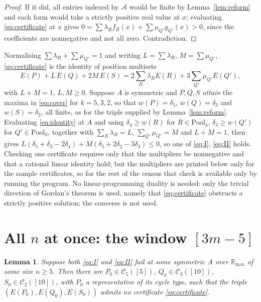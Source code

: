 \documentclass[11pt]{amsart}
\newtheorem{lemma}[theorem]{Lemma}
\newcommand{\Rmax}{\mathbb R_{\max}}
\newcommand{\dd}{\delta}
\newcommand{\Cov}{\mathcal C}
\newcommand{\Ee}{E}
\newcommand{\Allowed}{\mathcal A}
\begin{document}
\begin{proof}
If it did, all entries indexed by $\Allowed$ would be finite by
Lemma~\ref{lem:reform} and each form would take a strictly positive real value
at $x$; evaluating \eqref{eq:certificate} at $x$ gives
$0=\sum\lambda_Rf_R(x)+\sum\mu_{Q'}g_{Q'}(x)>0$, since the coefficients are
nonnegative and not all zero. Contradiction.
\end{proof}

Normalising $\sum\lambda_R+\sum\mu_{Q'}=1$ and writing
$L=\sum\lambda_R$, $M=\sum\mu_{Q'}$, \eqref{eq:certificate} is the identity of
position multisets
\begin{equation}\label{eq:identity}
 \Ee(P)+L\,\Ee(Q)+2M\,\Ee(S)
 = 2\sum_R\lambda_R\Ee(R)+3\sum_{Q'}\mu_{Q'}\Ee(Q') ,
\end{equation}
with $L+M=1$, $L,M\ge0$. Suppose $A$ is symmetric and $P,Q,S$ \emph{attain} the
maxima in \eqref{eq:cover} for $k=5,3,2$, so that $w(P)=\dd_5$, $w(Q)=\dd_3$ and
$w(S)=\dd_2$, all finite, as for the triple supplied by
Lemma~\ref{lem:reform}. Evaluating \eqref{eq:identity} at $A$ and using
$\dd_4\ge w(R)$ for $R\in\mathrm{Pool}_4$, $\dd_3\ge w(Q')$ for
$Q'\in\mathrm{Pool}_3$, together with $\sum_R\lambda_R=L$,
$\sum_{Q'}\mu_{Q'}=M$ and $L+M=1$, then gives
$L(\dd_5+\dd_3-2\dd_4)+M(\dd_5+2\dd_2-3\dd_3)\le0$, so one of \eqref{eq:I},
\eqref{eq:II} holds. Checking one certificate requires only that the
multipliers be nonnegative and that a rational linear identity hold; but the
multipliers are printed below only for the sample certificates, so for the rest
of the census that check is available only by running the program. No
linear-programming
duality is needed: only the trivial direction of Gordan's theorem
\cite{Gordan} is used, namely that \eqref{eq:certificate} obstructs a strictly
positive solution; the converse is not used.

\section{All $n$ at once: the window $[3m-5]$}

\begin{lemma}\label{lem:window}
Suppose both \eqref{eq:I} and \eqref{eq:II} fail at some symmetric $A$ over
$\Rmax$ of some size $n\ge5$. Then there are $P_0\in\Cov_5([5])$,
$Q_0\in\Cov_3([10])$, $S_0\in\Cov_2([10])$, with $P_0$ a representative of its
cycle type, such that the triple $(\Ee(P_0),\Ee(Q_0),\Ee(S_0))$ admits no
certificate \eqref{eq:certificate}.
\end{lemma}
\end{document}
